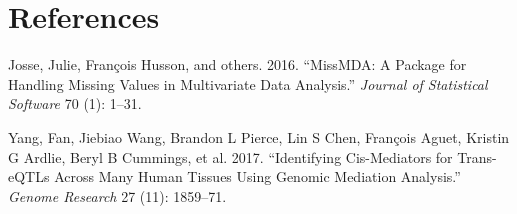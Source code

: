 \documentclass[
]{article}
\begin{document}
\newpage
\section*{References}

\hypertarget{refs}{}
\leavevmode\hypertarget{ref-josse2016missmda}{}%
Josse, Julie, François Husson, and others. 2016. ``MissMDA: A Package
for Handling Missing Values in Multivariate Data Analysis.''
\emph{Journal of Statistical Software} 70 (1): 1--31.

\leavevmode\hypertarget{ref-yang2017identifying}{}%
Yang, Fan, Jiebiao Wang, Brandon L Pierce, Lin S Chen, François Aguet,
Kristin G Ardlie, Beryl B Cummings, et al. 2017. ``Identifying
Cis-Mediators for Trans-eQTLs Across Many Human Tissues Using Genomic
Mediation Analysis.'' \emph{Genome Research} 27 (11): 1859--71.
\end{document}
